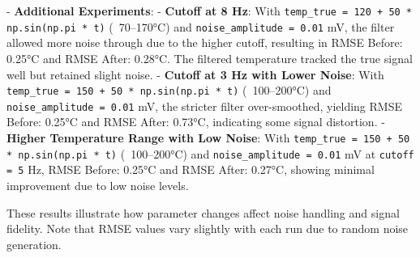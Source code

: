 \documentclass[12pt]{article}
\begin{document}
- \textbf{Additional Experiments}:
  - \textbf{Cutoff at 8 Hz}: With \texttt{temp\_true = 120 + 50 * np.sin(np.pi * t)} (~70–170°C) and \texttt{noise\_amplitude = 0.01} mV, the filter allowed more noise through due to the higher cutoff, resulting in RMSE Before: 0.25°C and RMSE After: 0.28°C. The filtered temperature tracked the true signal well but retained slight noise.
  - \textbf{Cutoff at 3 Hz with Lower Noise}: With \texttt{temp\_true = 150 + 50 * np.sin(np.pi * t)} (~100–200°C) and \texttt{noise\_amplitude = 0.01} mV, the stricter filter over-smoothed, yielding RMSE Before: 0.25°C and RMSE After: 0.73°C, indicating some signal distortion.
  - \textbf{Higher Temperature Range with Low Noise}: With \texttt{temp\_true = 150 + 50 * np.sin(np.pi * t)} (~100–200°C) and \texttt{noise\_amplitude = 0.01} mV at \texttt{cutoff = 5} Hz, RMSE Before: 0.25°C and RMSE After: 0.27°C, showing minimal improvement due to low noise levels.

These results illustrate how parameter changes affect noise handling and signal fidelity. Note that RMSE values vary slightly with each run due to random noise generation.
\end{document}

